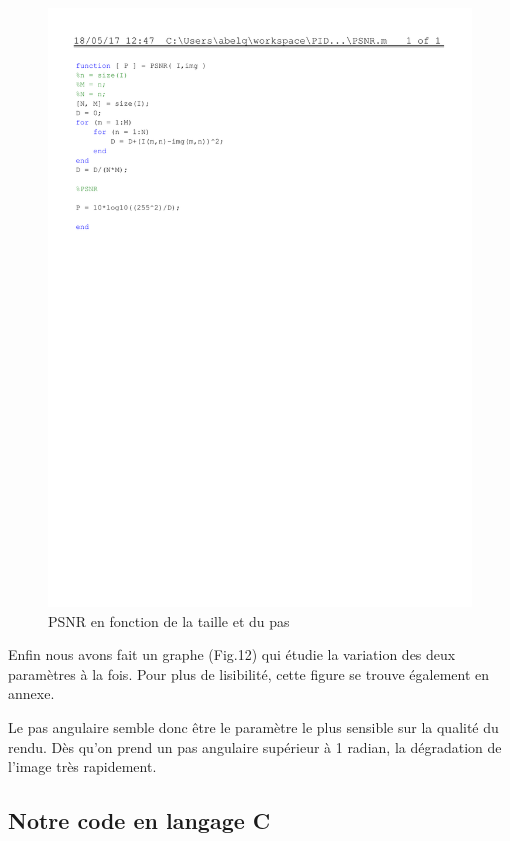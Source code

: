\documentclass[conference]{IEEEtran}
\begin{document}
\begin{figure}[H]
\centering
\includegraphics[scale=0.30]{PSNR}
	\caption[PSNR en fonction de la taille et du pas]{PSNR en fonction de la taille et du pas}
\label{fig:gallery}
\end{figure}

Enfin nous avons fait un graphe (Fig.12) qui étudie la variation des deux paramètres à la fois. Pour plus de lisibilité, cette figure se trouve également en annexe.
 
Le pas angulaire semble donc être le paramètre le plus sensible sur la qualité du rendu. Dès qu'on prend un pas angulaire supérieur à 1 radian, la dégradation de l'image très rapidement.

\subsection{Notre code en langage C}
\end{document}
